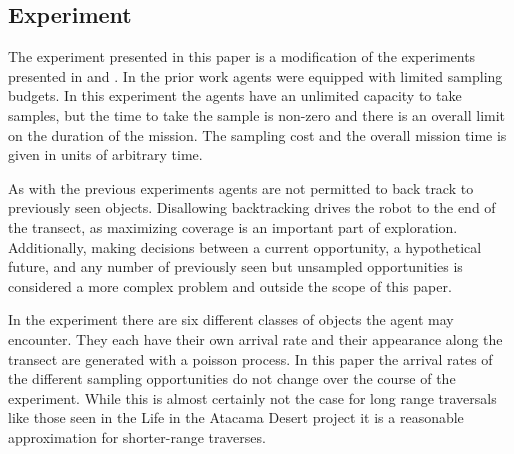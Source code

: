 \subsection{Experiment}


The experiment presented in this paper is a modification of the experiments
presented in \cite{furlong2014sequential} and \cite{furlong2014budgeting}.  In
the prior work agents were equipped with limited sampling budgets.  In this
experiment the agents have an unlimited capacity to take samples, but the time
to take the sample is non-zero and there is an overall limit on the duration of
the mission.  The sampling cost and the overall mission time is given in units of arbitrary time.

As with the previous experiments agents are not permitted to back track to previously seen objects.  Disallowing backtracking drives the robot to the end of the transect, as maximizing coverage is an
important part of exploration.  Additionally, making decisions
between a current opportunity, a hypothetical future, and any number of
previously seen but unsampled opportunities is considered a more complex
problem and outside the scope of this paper.

In the experiment there are six different classes of objects the agent may
encounter.  They each have their own arrival rate and their appearance along
the transect are generated with a poisson process.  In this paper the arrival
rates of the different sampling opportunities do not change over the course of
the experiment.  While this is almost certainly not the case for long range
traversals like those seen in the Life in the Atacama Desert project it is a
reasonable approximation for shorter-range traverses.

